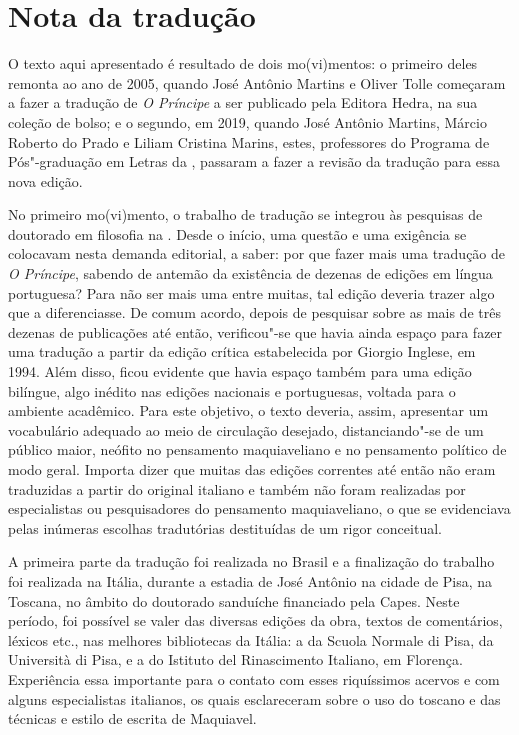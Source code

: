 \chapter{Nota da tradução}

O texto aqui apresentado é resultado de dois mo(vi)mentos: o primeiro
deles remonta ao ano de 2005, quando José Antônio Martins e Oliver Tolle
começaram a fazer a tradução de \emph{O Príncipe} a ser publicado pela
Editora Hedra, na sua coleção de bolso; e o segundo, em 2019, quando
José Antônio Martins, Márcio Roberto do Prado e Liliam Cristina Marins,
estes, professores do Programa de Pós"-graduação em Letras da ,
passaram a fazer a revisão da tradução para essa nova edição.

No primeiro mo(vi)mento, o trabalho de tradução se integrou às pesquisas
de doutorado em filosofia na . Desde o início, uma questão e uma
exigência se colocavam nesta demanda editorial, a saber: por que fazer
mais uma tradução de \emph{O Príncipe}, sabendo de antemão da existência
de dezenas de edições em língua portuguesa? Para não ser mais uma entre
muitas, tal edição deveria trazer algo que a diferenciasse. De comum
acordo, depois de pesquisar sobre as mais de três dezenas de publicações
até então, verificou"-se que havia ainda espaço para fazer uma tradução a
partir da edição crítica estabelecida por Giorgio Inglese, em 1994. Além
disso, ficou evidente que havia espaço também para uma edição bilíngue,
algo inédito nas edições nacionais e portuguesas, voltada para o
ambiente acadêmico. Para este objetivo, o texto deveria, assim,
apresentar um vocabulário adequado ao meio de circulação desejado,
distanciando"-se de um público maior, neófito no pensamento maquiaveliano
e no pensamento político de modo geral. Importa dizer que muitas das
edições correntes até então não eram traduzidas a partir do original
italiano e também não foram realizadas por especialistas ou
pesquisadores do pensamento maquiaveliano, o que se evidenciava pelas
inúmeras escolhas tradutórias destituídas de um rigor conceitual.

A primeira parte da tradução foi realizada no Brasil e a finalização do
trabalho foi realizada na Itália, durante a estadia de José Antônio na
cidade de Pisa, na Toscana, no âmbito do doutorado sanduíche financiado
pela Capes. Neste período, foi possível se valer das diversas edições da
obra, textos de comentários, léxicos etc., nas melhores bibliotecas da
Itália: a da Scuola Normale di Pisa, da Università di Pisa, e a do
Istituto del Rinascimento Italiano, em Florença. Experiência essa
importante para o contato com esses riquíssimos acervos e com alguns
especialistas italianos, os quais esclareceram sobre o uso do toscano e
das técnicas e estilo de escrita de Maquiavel.

